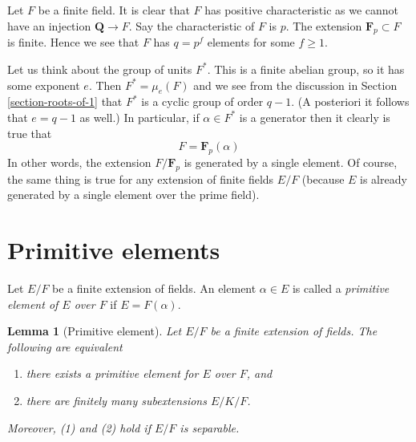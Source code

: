 \documentclass{stacks-project}
\theoremstyle{plain}
\newtheorem{lemma}[subsection]{Lemma}
\theoremstyle{definition}
\theoremstyle{remark}
\numberwithin{equation}{subsection}
\begin{document}
\noindent
Let $F$ be a finite field. It is clear that $F$ has positive characteristic
as we cannot have an injection $\mathbf{Q} \to F$. Say the characteristic
of $F$ is $p$. The extension $\mathbf{F}_p \subset F$ is finite.
Hence we see that $F$ has $q = p^f$ elements for some $f \geq 1$.

\medskip\noindent
Let us think about the group of units $F^*$. This is a finite abelian
group, so it has some exponent $e$. Then $F^* = \mu_e(F)$ and we see
from the discussion in Section \ref{section-roots-of-1} that $F^*$
is a cyclic group of order $q - 1$. (A posteriori it follows that
$e = q - 1$ as well.) In particular, if $\alpha \in F^*$ is a generator
then it clearly is true that
$$
F = \mathbf{F}_p(\alpha)
$$
In other words, the extension $F/\mathbf{F}_p$ is generated by a single
element. Of course, the same thing is true for any extension of finite
fields $E/F$ (because $E$ is already generated by a single element over
the prime field).





\section{Primitive elements}
\label{section-primitive-element}

\noindent
Let $E/F$ be a finite extension of fields. An element $\alpha \in E$
is called a {\it primitive element of $E$ over $F$} if $E = F(\alpha)$.

\begin{lemma}[Primitive element]
\label{lemma-primitive-element}
Let $E/F$ be a finite extension of fields. The following are equivalent
\begin{enumerate}
\item there exists a primitive element for $E$ over $F$, and
\item there are finitely many subextensions $E/K/F$.
\end{enumerate}
Moreover, (1) and (2) hold if $E/F$ is separable.
\end{lemma}
\end{document}
